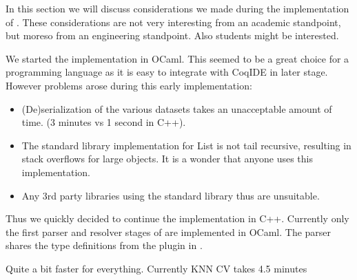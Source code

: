 \label{section:implementation}

In this section we will discuss considerations we made during the implementation of \roerei.
These considerations are not very interesting from an academic standpoint, but moreso from an engineering standpoint.
Also students might be interested.

We started the \roerei implementation in OCaml.
This seemed to be a great choice for a programming language as it is easy to integrate with CoqIDE in later stage.
However problems arose during this early implementation:
\begin{itemize}
\item (De)serialization of the various datasets takes an unacceptable amount of time. (3 minutes vs 1 second in C++).
\item The standard library implementation for List is not tail recursive, resulting in stack overflows for large objects.
    It is a wonder that anyone uses this implementation.
\item Any 3rd party libraries using the standard library thus are unsuitable.
\end{itemize}

Thus we quickly decided to continue the implementation in C++.
Currently only the first parser and resolver stages of \roerei are implemented in OCaml.
The parser shares the \acic type definitions from the \xml plugin in .


Quite a bit faster for everything.
Currently KNN CV takes 4.5 minutes

